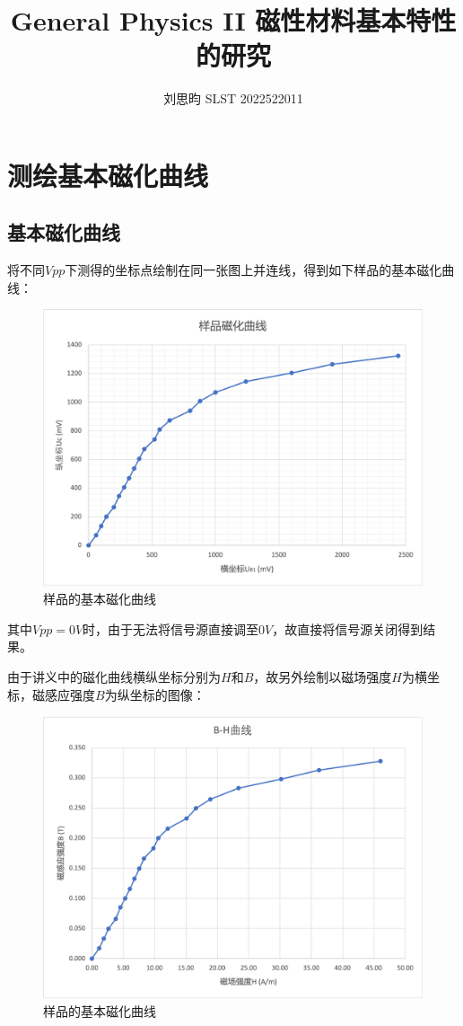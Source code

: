 \documentclass{article}
\author{刘思昀 SLST 2022522011}
\title{General Physics II 磁性材料基本特性的研究}
\begin{document}
\date{}

\maketitle

\section{测绘基本磁化曲线}
\subsection{基本磁化曲线}
将不同$Vpp$下测得的坐标点绘制在同一张图上并连线，得到如下样品的基本磁化曲线：
\begin{figure}[htbp]
    \centering
    \includegraphics[width=1.0\textwidth]{plot1.png}
    \caption{样品的基本磁化曲线}
\end{figure}

其中$Vpp = 0V$时，由于无法将信号源直接调至$0V$，故直接将信号源关闭得到结果。

由于讲义中的磁化曲线横纵坐标分别为$H$和$B$，故另外绘制以磁场强度$H$为横坐标，磁感应强度$B$为纵坐标的图像：
\begin{figure}[htbp]
    \centering
    \includegraphics[width=1.0\textwidth]{plot11.png}
    \caption{样品的基本磁化曲线}
\end{figure}
\end{document}
